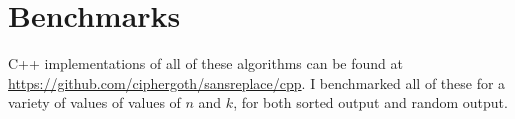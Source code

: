 \documentclass[letterpaper,luatex,11pt]{article}
\begin{document}
\inputminted{Python}{code/choose_binom.py}

\section{Benchmarks}

C++ implementations of all of these algorithms can be found at 
\url{https://github.com/ciphergoth/sansreplace/cpp}. I benchmarked
all of these for a variety of values of values of \(n\) and \(k\),
for both sorted output and random output. 

\printbibliography
\end{document}
